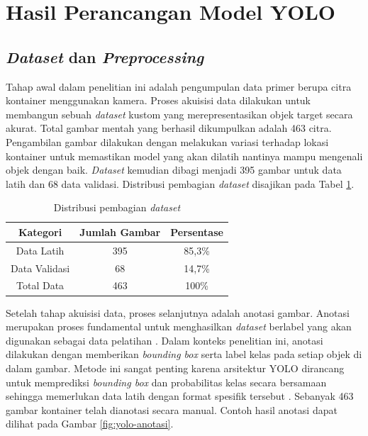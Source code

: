 \section{Hasil Perancangan Model YOLO}
\subsection{\textit{Dataset} dan \textit{Preprocessing}}
Tahap awal dalam penelitian ini adalah pengumpulan data primer berupa
citra kontainer menggunakan kamera. Proses akuisisi data dilakukan
untuk membangun sebuah \textit{dataset} kustom yang merepresentasikan objek
target secara akurat. Total gambar mentah yang berhasil dikumpulkan
adalah 463 citra. Pengambilan gambar dilakukan dengan melakukan
variasi terhadap lokasi kontainer untuk memastikan model yang akan
dilatih nantinya mampu mengenali objek dengan baik. \textit{Dataset} kemudian
dibagi menjadi 395 gambar untuk data latih dan 68 data validasi.
Distribusi pembagian \textit{dataset} disajikan pada Tabel
\ref{tab:pembagian-dataset}.

\begin{table}[H]
  \caption{Distribusi pembagian \textit{dataset}}
  \label{tab:pembagian-dataset}
  \vspace{-1em}
  \centering
  \begin{tabular}{ccc}
    \toprule
    \textbf{Kategori} & \textbf{Jumlah Gambar} & \textbf{Persentase} \\
    \midrule
    Data Latih & 395 & 85,3\% \\
    Data Validasi & 68 & 14,7\% \\
    Total Data & 463 & 100\% \\
    \bottomrule
  \end{tabular}
\end{table}

Setelah tahap akuisisi data, proses selanjutnya adalah anotasi
gambar. Anotasi merupakan proses fundamental untuk menghasilkan
\textit{dataset} berlabel yang
akan digunakan sebagai data pelatihan \citep{19}. Dalam
konteks penelitian ini, anotasi dilakukan dengan memberikan
\textit{bounding box} serta label kelas pada setiap objek di dalam
gambar. Metode ini sangat penting karena arsitektur YOLO dirancang
untuk memprediksi \textit{bounding box} dan probabilitas kelas secara
bersamaan sehingga memerlukan data latih dengan format spesifik
tersebut \citep{20}. Sebanyak 463 gambar kontainer telah
dianotasi secara manual. Contoh hasil anotasi dapat dilihat pada Gambar
\ref{fig:yolo-anotasi}.

